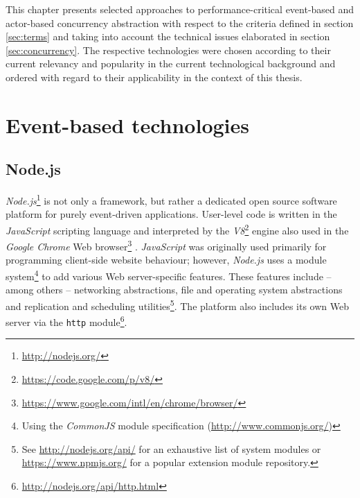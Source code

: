 This chapter presents selected approaches to performance-critical event-based and actor-based concurrency abstraction with respect to the criteria defined in section \ref{sec:terms} and taking into account the technical issues elaborated in section \ref{sec:concurrency}. The respective technologies were chosen according to their current relevancy and popularity in the current technological background and ordered with regard to their applicability in the context of this thesis.

\section{Event-based technologies}
\label{sec:evnt}

\subsection{Node.js}
\label{sec:nodejs}

\textit{Node.js}\footnote{\url{http://nodejs.org/}} is not only a framework, but rather a dedicated open source software platform for purely event-driven applications. User-level code is written in the \textit{JavaScript} scripting language and interpreted by the \textit{V8}\footnote{\url{https://code.google.com/p/v8/}} engine also used in the \textit{Google Chrome} Web browser\footnote{\url{https://www.google.com/intl/en/chrome/browser/}} \cite[p. 19]{Hughes-Croucher2012}. \textit{JavaScript} was originally used primarily for programming client-side website behaviour; however, \textit{Node.js} uses a module system\footnote{Using the \textit{CommonJS} module specification (\url{http://www.commonjs.org/})} to add various Web server-specific features. These features include -- among others -- networking abstractions, file and operating system abstractions and replication and scheduling utilities\footnote{See \url{http://nodejs.org/api/} for an exhaustive list of system modules or \url{https://www.npmjs.org/} for a popular extension module repository.}. The platform also includes its own Web server via the \texttt{http} module\footnote{\url{http://nodejs.org/api/http.html}}.

